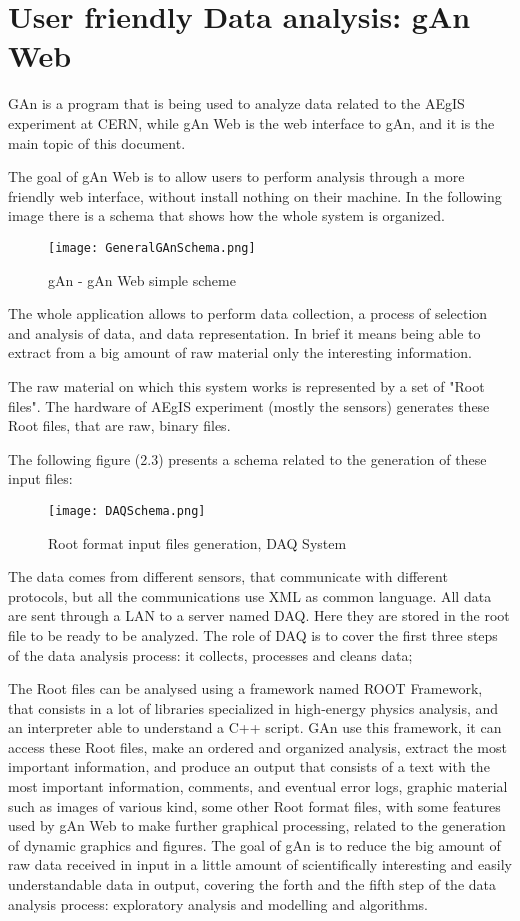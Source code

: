 \section{User friendly Data analysis: gAn Web}

GAn is a program that is being used to analyze data related to the AEgIS experiment at CERN, while gAn Web is the web interface to gAn, and it is the main topic of this document.

The goal of gAn Web is to allow users to perform analysis through a more friendly web interface, without install nothing on their machine. In the following image there is a schema that shows how the whole system is organized.

\begin{figure}[H]
\centering
\texttt{[image: GeneralGAnSchema.png]} 
\caption{gAn - gAn Web simple scheme}
\end{figure}

The whole application allows to perform data collection, a process of selection and analysis of data, and data representation. In brief it means being able to extract from a big amount of raw material only the interesting information.

The raw material on which this system works is represented by a set of "Root files". 
The hardware of AEgIS experiment (mostly the sensors) generates these Root files, that are raw, binary files. 
 
The following figure (2.3) presents a schema related to the generation of these input files:

\begin{figure}[H]
\centering
\texttt{[image: DAQSchema.png]} 
\caption{Root format input files generation, DAQ System}
\end{figure}

The data comes from different sensors, that communicate with different protocols, but all the communications use XML as common language. All data are sent through a LAN to a server named DAQ. Here they are stored in the root file to be ready to be analyzed.
The role of DAQ is to cover the first three steps of the data analysis process: it collects, processes and cleans data;

The Root files can be analysed using a framework named ROOT Framework, that consists in a lot of libraries specialized in high-energy physics analysis, and an interpreter able to understand a C++ script.
GAn use this framework, it can access these Root files, make an ordered and organized analysis, extract the most important information, and produce an output that consists of a text with the most important information, comments, and eventual error logs, graphic material such as images of various kind, some other Root format files, with some features used by gAn Web to make further graphical processing, related to the generation of dynamic graphics and figures. 
The goal of gAn is to reduce the big amount of raw data received in input in a little amount of scientifically interesting and easily understandable data in output, covering the forth and the fifth step of the data analysis process: exploratory analysis and modelling and algorithms.

